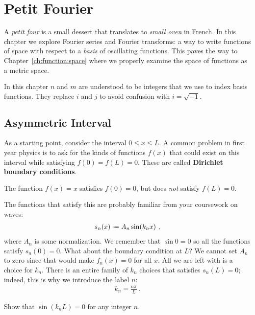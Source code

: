 
\chapter{Petit Fourier}

A \emph{petit four} is a small dessert that translates to \emph{small oven} in French. In this chapter we explore Fourier series and Fourier transforms: a way to write functions of space with respect to a \emph{basis} of oscillating functions. This paves the way to Chapter~\ref{ch:function:space} where we properly examine the space of functions as a metric space.

In this chapter $n$ and $m$ are understood to be integers that we use to index basis functions. They replace $i$ and $j$ to avoid confusion with $i=\sqrt{-1}$. 

\section{Asymmetric Interval}

As a starting point, consider the interval $0 \leq x \leq L$. A common problem in first year physics is to ask for the kinds of functions $f(x)$ that could exist on this interval while satisfying $f(0)=f(L)=0$. These are called \textbf{Dirichlet boundary conditions}. 
\begin{example}
The function $f(x)=x$ satisfies $f(0)=0$, but does \emph{not} satisfy $f(L)=0$. 
\end{example}
The functions that satisfy this are probably familiar from your coursework on waves:
\begin{align}
    s_n(x) \defeq A_n \sin(k_n x) \ ,
\end{align}
where $A_n$ is some normalization. We remember that $\sin 0 = 0$ so all the functions satisfy $s_n(0)=0$. What about the boundary condition at $L$? We cannot set $A_n$ to zero since that would make $f_n(x) = 0$ for all $x$. All we are left with is a choice for $k_n$. There is an entire family of $k_n$ choices that satisfies $s_n(L)=0$; indeed, this is why we introduce the label $n$:
\begin{align}
    k_n = \frac{n\pi}{L} \ .
\end{align}
\begin{exercise}
Show that $\sin(k_n L) = 0$ for any integer $n$. 
\end{exercise}

